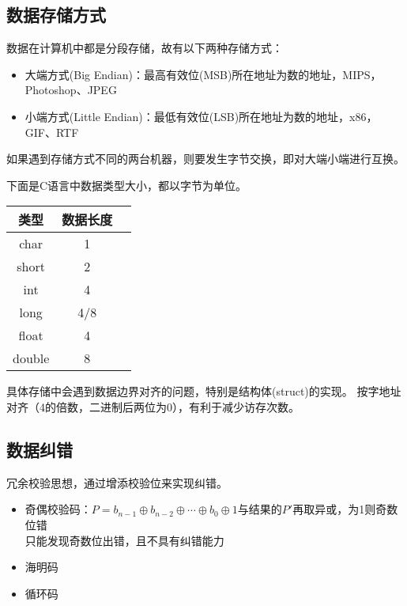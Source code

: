 \subsection{数据存储方式}
数据在计算机中都是分段存储，故有以下两种存储方式：
\begin{itemize}
	\item 大端方式(Big Endian)：最高有效位(MSB)所在地址为数的地址，MIPS，Photoshop、JPEG
	\item 小端方式(Little Endian)：最低有效位(LSB)所在地址为数的地址，x86，GIF、RTF
\end{itemize}
\par 如果遇到存储方式不同的两台机器，则要发生字节交换，即对大端小端进行互换。

下面是C语言中数据类型大小，都以字节为单位。
\begin{center}
\begin{tabular}{|c|c|c|}\hline
类型 & 数据长度\\\hline
char & 1 \\\hline
short & 2 \\\hline
int & 4 \\\hline
long & 4/8 \\\hline
float & 4 \\\hline
double & 8 \\\hline
\end{tabular}
\end{center}
\par 具体存储中会遇到数据边界对齐的问题，特别是结构体(struct)的实现。
按字地址对齐（4的倍数，二进制后两位为0），有利于减少访存次数。

\subsection{数据纠错}
冗余校验思想，通过增添校验位来实现纠错。
\begin{itemize}
	\item 奇偶校验码：$P=b_{n-1}\oplus b_{n-2}\oplus\cdots\oplus b_0\oplus 1$与结果的$P'$再取异或，为1则奇数位错\\
	只能发现奇数位出错，且不具有纠错能力
	\item 海明码
	\item 循环码
\end{itemize}